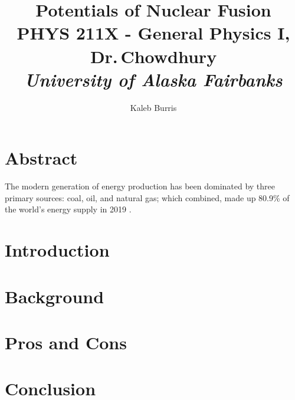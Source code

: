 \documentclass[12pt]{article}
\title{
    \textbf{Potentials of Nuclear Fusion} 
    \\
    \vspace{0.5cm}
    \large PHYS 211X - General Physics I, Dr.\,Chowdhury
    \\
    \emph{University of Alaska Fairbanks}
}
\date{}
\author{
    Kaleb Burris
}
\begin{document}
    \maketitle

    \thispagestyle{plain}

    \section{Abstract}

    The modern generation of energy production has been dominated by three primary sources: coal, oil, and natural gas; which combined, made up 80.9\% of the world's energy supply in 2019 \citep[Supply]{KWES}.

    \pagebreak

    \section{Introduction}

    \lipsum[3-5]

    \pagebreak

    \section{Background}

    \lipsum[6-9]

    \pagebreak

    \section{Pros and Cons}

    \lipsum[10-14]

    \pagebreak

    \section{Conclusion}

    \lipsum[15-19]

    \pagebreak

    \pagestyle{empty}

    

    
\end{document}
